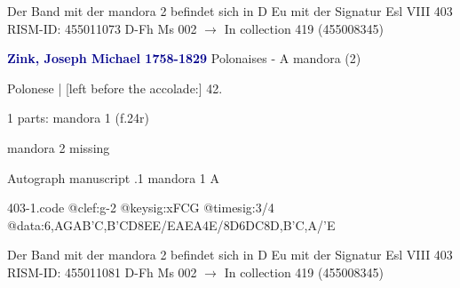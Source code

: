 \documentclass[twocolumn]{book}
\begin{document}
\newline Der Band mit der mandora 2 befindet sich in D Eu mit der Signatur Esl VIII 403
\newline RISM-ID: 455011073
\newline D-Fh  Ms 002
\newline $\rightarrow$ In collection 419 (455008345)
      
\newline \par \vspace{7pt} \textcolor{darkblue}{\textbf{Zink, Joseph Michael  1758-1829}}
\newline Polonaises - A
\newline mandora (2)
\newline \begin{itshape}[f.24v, at left:] Polonese | [left before the accolade:] 42.\end{itshape} 
\newline \textcolor{darkblue}{}  1 parts: mandora 1  (f.24r)
\newline \begin{small} mandora 2 missing\end{small} 
\newline Autograph manuscript
.1  mandora 1  A  
\begin{filecontents*}{403-1.code}
@clef:g-2
@keysig:xFCG
@timesig:3/4
@data:{6,AGAB}{'C,B}{'CD}{8EE}/EAEA4E/{8D6DC}8D,B'C,A/'E
\end{filecontents*}
\newline
%

\newline Der Band mit der mandora 2 befindet sich in D Eu mit der Signatur Esl VIII 403
\newline RISM-ID: 455011081
\newline D-Fh  Ms 002
\newline $\rightarrow$ In collection 419 (455008345)
      
\end{document}
